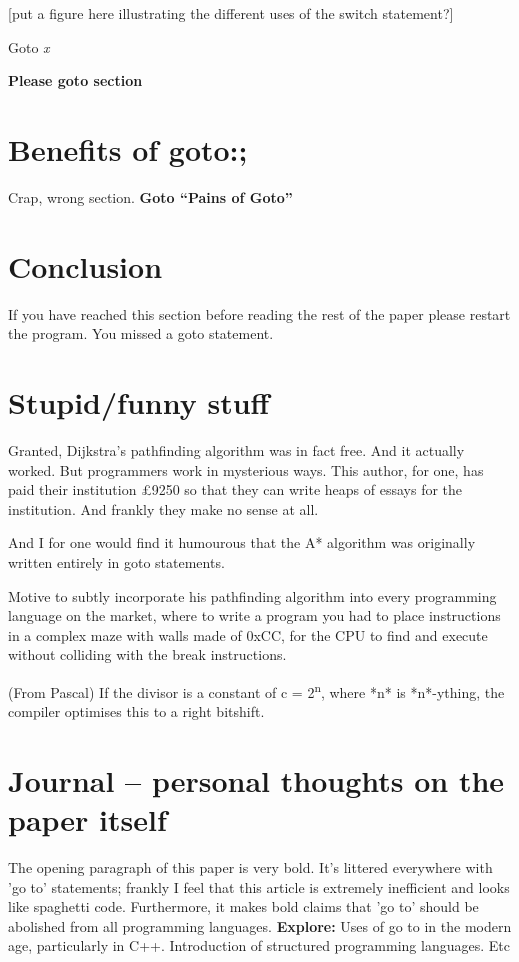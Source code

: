 \documentclass{journal}
\begin{document}
[put a figure here illustrating the different uses of the switch statement?]

Goto \textit{x}

\textbf{Please goto section }

\section{Benefits of goto:;}
Crap, wrong section. \textbf{Goto ``Pains of Goto''}

\section{Conclusion}
If you have reached this section before reading the rest of the paper please restart the program. You missed a goto statement.

\section{Stupid/funny stuff}
Granted, Dijkstra's pathfinding algorithm was in fact free. And it actually worked. But programmers work in mysterious ways. This author, for one, has paid their institution £9250 so that they can write heaps of essays for the institution. And frankly they make no sense at all.

And I for one would find it humourous that the A* algorithm was originally written entirely in goto statements.

Motive to subtly incorporate his pathfinding algorithm into every programming language on the market, where to write a program you had to place instructions in a complex maze with walls made of 0xCC, for the CPU to find and execute without colliding with the break instructions.

(From Pascal) If the divisor is a constant of c = 2\textsuperscript{n}, where *n* is *n*-ything, the compiler optimises this to a right bitshift.

\section{Journal -- personal thoughts on the paper itself}
The opening paragraph of this paper is very bold. It's littered everywhere with 'go to' statements; frankly I feel that this article is extremely inefficient and looks like spaghetti code. Furthermore, it makes bold claims that 'go to' should be abolished from all programming languages. \textbf{Explore:} Uses of go to in the modern age, particularly in C++. Introduction of structured programming languages. Etc
\end{document}
